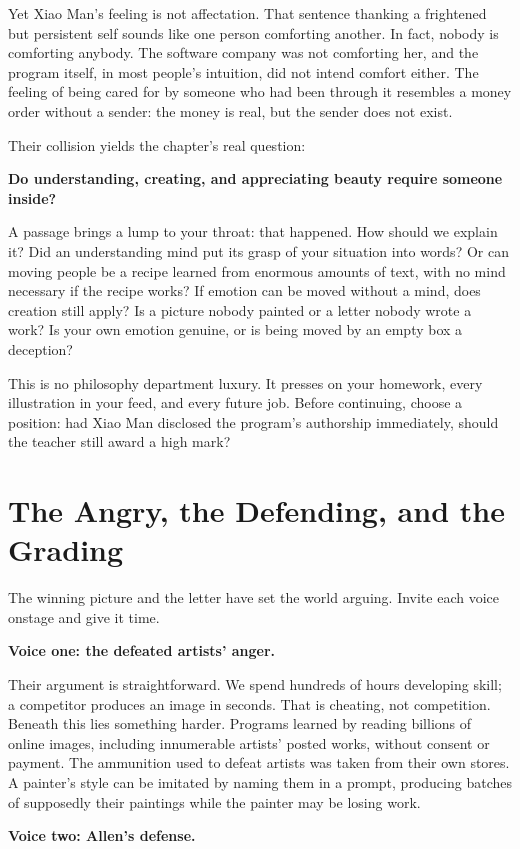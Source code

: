 Yet Xiao Man's feeling is not affectation. That sentence thanking a frightened but persistent self sounds like one person comforting another. In fact, nobody is comforting anybody. The software company was not comforting her, and the program itself, in most people's intuition, did not intend comfort either. The feeling of being cared for by someone who had been through it resembles a money order without a sender: the money is real, but the sender does not exist.

Their collision yields the chapter's real question:

\textbf{Do understanding, creating, and appreciating beauty require someone inside?}

A passage brings a lump to your throat: that happened. How should we explain it? Did an understanding mind put its grasp of your situation into words? Or can moving people be a recipe learned from enormous amounts of text, with no mind necessary if the recipe works? If emotion can be moved without a mind, does creation still apply? Is a picture nobody painted or a letter nobody wrote a work? Is your own emotion genuine, or is being moved by an empty box a deception?

This is no philosophy department luxury. It presses on your homework, every illustration in your feed, and every future job. Before continuing, choose a position: had Xiao Man disclosed the program's authorship immediately, should the teacher still award a high mark?

\section{The Angry, the Defending, and the Grading}
The winning picture and the letter have set the world arguing. Invite each voice onstage and give it time.

\textbf{Voice one: the defeated artists' anger.}

Their argument is straightforward. We spend hundreds of hours developing skill; a competitor produces an image in seconds. That is cheating, not competition. Beneath this lies something harder. Programs learned by reading billions of online images, including innumerable artists' posted works, without consent or payment. The ammunition used to defeat artists was taken from their own stores. A painter's style can be imitated by naming them in a prompt, producing batches of supposedly their paintings while the painter may be losing work.

\textbf{Voice two: Allen's defense.}

